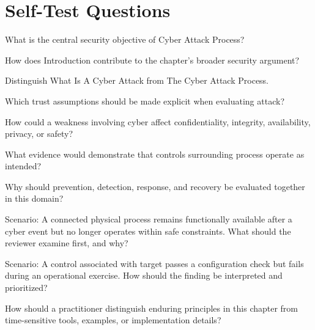 \documentclass[11pt,letterpaper]{article}
\begin{document}
\section*{Self-Test Questions}
\begin{CornellRecallList}
\item What is the central security objective of Cyber Attack Process?
\item How does Introduction contribute to the chapter's broader security argument?
\item Distinguish What Is A Cyber Attack from The Cyber Attack Process.
\item Which trust assumptions should be made explicit when evaluating attack?
\item How could a weakness involving cyber affect confidentiality, integrity, availability, privacy, or safety?
\item What evidence would demonstrate that controls surrounding process operate as intended?
\item Why should prevention, detection, response, and recovery be evaluated together in this domain?
\item Scenario: A connected physical process remains functionally available after a cyber event but no longer operates within safe constraints. What should the reviewer examine first, and why?
\item Scenario: A control associated with target passes a configuration check but fails during an operational exercise. How should the finding be interpreted and prioritized?
\item How should a practitioner distinguish enduring principles in this chapter from time-sensitive tools, examples, or implementation details?
\end{CornellRecallList}
\end{document}
